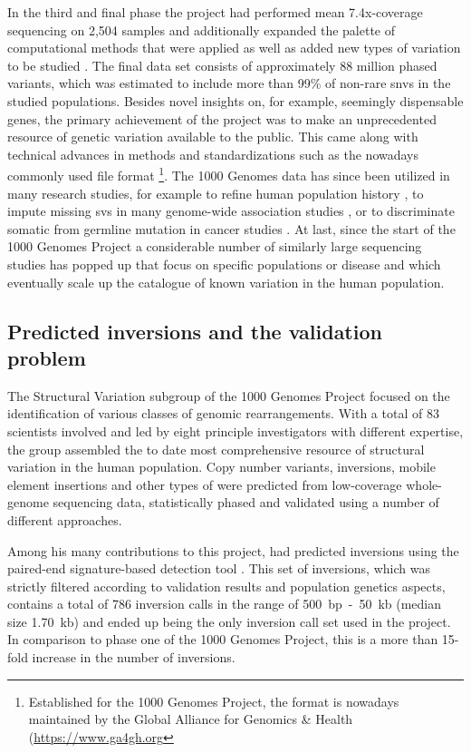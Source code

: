 In the third and final phase the project had performed mean 7.4x-coverage
sequencing on 2,504 samples and additionally expanded the palette of
computational methods that were applied as well as added new types of variation
to be studied \citep{Auton2015}. The final data set consists of approximately
88 million phased variants, which was estimated to include more than 99\% of
non-rare \acp{snv} in the studied populations. Besides novel insights on, for example,
seemingly dispensable genes, the primary achievement of the project was to make
an unprecedented resource of genetic variation available to the public. This
came along with technical advances in methods and standardizations such as the
nowadays commonly used file format \vcf\footnote{Established for the
1000 Genomes Project, the format is nowadays maintained by the Global Alliance
for Genomics \& Health (\url{https://www.ga4gh.org}}.
The 1000 Genomes data has since been utilized in many research studies, for
example to refine human population history \citep{Veeramah2014}, to
impute \citep{Howie2012} missing \acp{sv} in many genome-wide association studies
\citep[for example]{Wood2014}, or to discriminate somatic from germline mutation in
cancer studies \citep{Hiltemann2015}. At last, since the start of the 1000
Genomes Project a considerable number of similarly large sequencing studies has
popped up that focus on specific populations \citep{UK10K,Sulem2015,Telenti2016}
or disease \citep{Campbell2017} and which eventually scale up the catalogue of
known variation in the human population.




\subsection{Predicted inversions and the validation problem}

The Structural Variation subgroup of the 1000 Genomes Project focused on the
identification of various classes of genomic rearrangements. With a total of 83
scientists involved and led by eight principle investigators with different
expertise, the group assembled the to date most comprehensive resource of
structural variation in the human population. Copy number variants, inversions,
mobile element insertions and other types of \sv were predicted from
low-coverage whole-genome sequencing data, statistically phased and
validated using a number of different approaches.

Among his many contributions to this project, \tobias had predicted inversions
using the paired-end signature-based \sv detection tool \delly. This set of
inversions, which was strictly filtered according to validation results and
population genetics aspects, contains a total of 786 inversion calls in the
range of 500~bp~-~50~kb (median size 1.70~kb) and ended up being the only
inversion call set used in the project. In comparison to phase one of the 1000
Genomes Project, this is a more than 15-fold increase in the number of
inversions.

